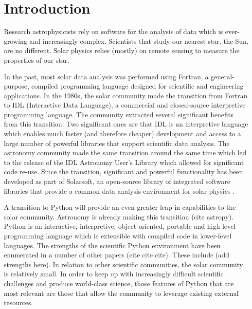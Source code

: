 \section{Introduction}
\label{sec:intro}

Research astrophysicists rely on software for the analysis of data which is ever-growing and increasingly complex.
Scientists that study our nearest star, the Sun, are no different.
Solar physics relies (mostly) on remote sensing to measure the properties of our star.

In the past, most solar data analysis was performed using Fortran, a general-purpose, compiled programming language designed for scientific and engineering applications.
In the 1980s, the solar community made the transition from Fortran to IDL (Interactive Data Language), a commercial and closed-source interpretive programming language.
The community extracted several significant benefits from this transition.
Two significant ones are that IDL is an interpretive language which enables much faster (and therefore cheaper) development and access to a large number of powerful libraries that support scientific data analysis.
The astronomy community made the same transition around the same time which led to the release of the IDL Astronomy User's Library which allowed for significant code re-use.
Since the transition, significant and powerful functionality has been developed as part of Solarsoft, an open-source library of integrated software libraries that provide a common data analysis environment for solar physics \citet{freeland1998}.

A transition to Python will provide an even greater leap in capabilities to the solar community.
Astronomy is already making this transition (cite astropy).
Python is an interactive, interpretive, object-oriented, portable and high-level programming language which is extensible with compiled code in lower-level languages.
The strengths of the scientific Python environment have been enumerated in a number of other papers (cite cite cite). These include (add strengths here).
In relation to other scientific communities, the solar community is relatively small.
In order to keep up with increasingly difficult scientific challenges and produce world-class science, those features of Python that are most relevant are those that allow the community to leverage existing external resources.

